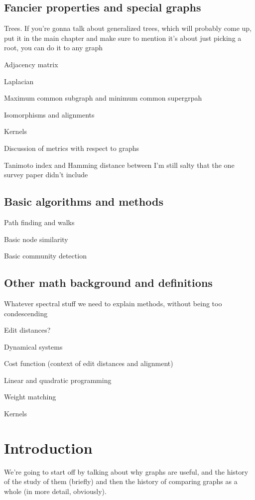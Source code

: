 \documentclass[12pt]{thesis}
\theoremstyle{plain}
\theoremstyle{definition}
\theoremstyle{remark}
\begin{document}
\section{Fancier properties and special graphs}

Trees. If you're gonna talk about generalized trees, which will probably come up, put it in the main chapter and make sure to mention it's about just picking a root, you can do it to any graph

Adjacency matrix

Laplacian

Maximum common subgraph and minimum common supergrpah

Isomorphisms and alignments

Kernels

Discussion of metrics with respect to graphs

Tanimoto index and Hamming distance between I'm still salty that the one survey paper didn't include

\section{Basic algorithms and methods}

Path finding and walks

Basic node similarity

Basic community detection

\section{Other math background and definitions}

Whatever spectral stuff we need to explain methods, without being too condescending

Edit distances?

Dynamical systems

Cost function (context of edit distances and alignment)

Linear and quadratic programming

Weight matching

Kernels



\chapter{Introduction}

We're going to start off by talking about why graphs are useful, and the history of the study of them (briefly) and then the history of comparing graphs as a whole (in more detail, obviously).
\end{document}
